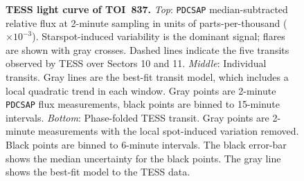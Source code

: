 \documentclass[12pt,twocolumn,tighten]{aastex63}
\newcommand{\tn}{TOI~837} %
\begin{document}
\begin{figure}[!t]
	\begin{center}
		\leavevmode
		
		\vspace{-0.5cm}
	\end{center}
	\vspace{-0.6cm}
	\caption{
    {\bf TESS light curve of \tn.}
    {\it Top}:
    \texttt{PDCSAP} median-subtracted relative flux at 2-minute
    sampling in units of parts-per-thousand ($\times 10^{-3}$).
    Starspot-induced variability is the dominant signal; flares are
    shown with gray crosses.  Dashed lines indicate the five transits
    observed by TESS over Sectors 10 and 11.  {\it Middle}: Individual
    transits.  Gray lines are the best-fit transit model, which
    includes a local quadratic trend in each window. Gray points are
    2-minute \texttt{PDCSAP} flux measurements, black points are binned to
    15-minute intervals.  {\it Bottom}: Phase-folded TESS transit.
    Gray points are 2-minute measurements with the local spot-induced
    variation removed.  Black points are binned to 6-minute intervals.
    The black error-bar shows the median uncertainty for the black
    points.  The gray line shows the best-fit model to the TESS data. 
		\label{fig:tessphot}
	}
\end{figure}
\end{document}
